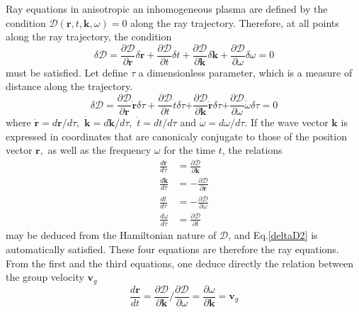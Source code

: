 \documentclass[a4paper,12pt]{article}%
\begin{document}
Ray equations in anisotropic an inhomogeneous plasma are defined by the
condition $\mathcal{D}\left(  \mathbf{r},t,\mathbf{k,}\omega\right)  =0$ along
the ray trajectory. Therefore, at all points along the ray trajectory, the
condition
\begin{equation}
\delta\mathcal{D=}\frac{\partial\mathcal{D}}{\partial\mathbf{r}}%
\delta\mathbf{r}+\frac{\partial\mathcal{D}}{\partial t}\delta t+\frac
{\partial\mathcal{D}}{\partial\mathbf{k}}\delta\mathbf{k+}\frac{\partial
\mathcal{D}}{\partial\omega}\delta\omega=0
\end{equation}
must be satisfied. Let define $\tau$ a dimensionless parameter, which is a
measure of distance along the trajectory.
\begin{equation}
\delta\mathcal{D=}\frac{\partial\mathcal{D}}{\partial\mathbf{r}}%
\mathbf{\dot{r}}\delta\tau+\frac{\partial\mathcal{D}}{\partial t}\dot{t}%
\delta\tau\mathbf{+}\frac{\partial\mathcal{D}}{\partial\mathbf{k}}%
\mathbf{\dot{r}}\delta\tau\mathbf{+}\frac{\partial\mathcal{D}}{\partial\omega
}\dot{\omega}\delta\tau=0 \label{deltaD2}%
\end{equation}
where $\mathbf{\dot{r}=}d\mathbf{r/}d\tau,$ $\mathbf{\dot{k}=}d\mathbf{k/}%
d\tau,$ $\dot{t}\mathbf{=}dt\mathbf{/}d\tau$ and $\dot{\omega}=d\omega
\mathbf{/}d\tau.$ If the wave vector $\mathbf{k}$ is expressed in coordinates
that are canonicaly conjugate to those of the position vector $\mathbf{r,}$ as
well as the frequency $\omega$ for the time $t$, the relations%
\begin{align}
\frac{d\mathbf{r}}{d\tau}  &  =\frac{\partial\mathcal{D}}{\partial\mathbf{k}%
}\\
\frac{d\mathbf{k}}{d\tau}  &  =-\frac{\partial\mathcal{D}}{\partial\mathbf{r}%
}\\
\frac{dt}{d\tau}  &  =-\frac{\partial\mathcal{D}}{\partial\omega}\\
\frac{d\omega}{d\tau}  &  =\frac{\partial\mathcal{D}}{\partial t}%
\end{align}
may be deduced from the Hamiltonian nature of $\mathcal{D}$, and
Eq.\ref{deltaD2} is automatically satisfied. These four equations are
therefore the ray equations. From the first and the third equations, one
deduce directly the relation between the group velocity $\mathbf{v}_{g}$
\begin{equation}
\frac{d\mathbf{r}}{dt}=\frac{\partial\mathcal{D}}{\partial\mathbf{k}}%
/\frac{\partial\mathcal{D}}{\partial\omega}=\frac{\partial\omega}%
{\partial\mathbf{k}}=\mathbf{v}_{g}%
\end{equation}
\end{document}
